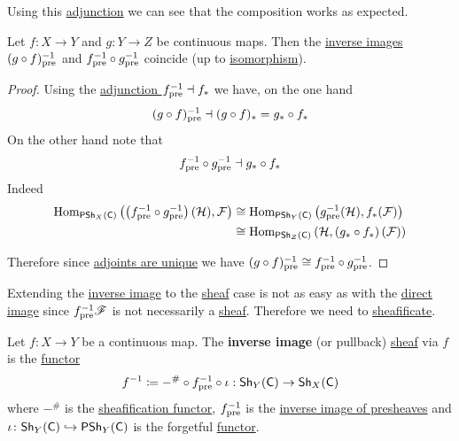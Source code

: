 \documentclass[../../main]{subfiles}
\begin{document}
Using this \hyperref[def:adjoint-functors]{adjunction} we can see that the composition works as expected.
\begin{lemma}\label{lemma:composition-inverse-image-presheaf}
  Let \(f\colon X \to Y\) and \(g\colon Y \to Z\) be continuous maps.
  Then the \hyperref[def:inverse-image-presheaf]{inverse images} \((g \circ f)_{\operatorname*{pre}}^{-1}\) and \(f_{\operatorname*{pre}}^{-1} \circ g_{\operatorname*{pre}}^{-1}\) coincide (up to \hyperref[def:categorical-isomorphism]{isomorphism}).
\end{lemma}
\begin{proof}
  Using the \hyperref[thm:direct-inverse-image-adjunction-presheaf]{adjunction \(f_{\operatorname*{pre}}^{-1} \dashv f_{\ast}\)} we have, on the one hand
  \begin{equation*}
    (g \circ f)_{\operatorname*{pre}}^{-1} \dashv (g \circ f)_{\ast} = g_{\ast} \circ f_{\ast}
  \end{equation*}
  On the other hand note that
  \begin{equation*}
    f_{\operatorname*{pre}}^{-1} \circ g_{\operatorname*{pre}}^{-1} \dashv g_{\ast} \circ f_{\ast}
  \end{equation*}
  Indeed
  \begin{align*}
    \operatorname{Hom}_{\mathsf{PSh}_{X}(\mathsf{C})} \left( \left( f_{\operatorname*{pre}}^{-1} \circ g_{\operatorname*{pre}}^{-1} \right) (\mathcal{H}), \mathcal{F} \right) &\cong \operatorname{Hom}_{\mathsf{PSh}_{Y}(\mathsf{C})} \left( g_{\operatorname*{pre}}^{-1}(\mathcal{H}), f_{\ast}(\mathcal{F}) \right) \\
                                                                                                   &\cong \operatorname{Hom}_{\mathsf{PSh}_{Z}(\mathsf{C})} \left( \mathcal{H}, \left( g_{\ast} \circ f_{\ast} \right)(\mathcal{F}) \right)
  \end{align*}

  Therefore since \hyperref[prop:uniqueness-adjoints]{adjoints are unique} we have \((g \circ f)_{\operatorname*{pre}}^{-1} \cong f_{\operatorname*{pre}}^{-1} \circ g_{\operatorname*{pre}}^{-1}\).
\end{proof}

Extending the \hyperref[def:inverse-image-presheaf]{inverse image} to the \hyperref[def:sheaf]{sheaf} case is not as easy as with the \hyperref[def:direct-image-sheaf]{direct image} since \(f_{\operatorname{pre}}^{-1}\mathscr{F}\) is not necessarily a \hyperref[def:sheaf]{sheaf}.
Therefore we need to \hyperref[def:sheafification]{sheafificate}.
\begin{definition}\label{def:inverse-image-sheaf}
  Let \(f\colon X \to Y\) be a continuous map.
  The \textbf{inverse image} (or pullback) \hyperref[def:sheaf]{sheaf} via \(f\) is the \hyperref[def:functor]{functor}
  \begin{equation*}
    f^{-1} \coloneq -^{\#} \circ f_{\operatorname*{pre}}^{-1} \circ \iota: \mathsf{Sh}_{Y}(\mathsf{C}) \to \mathsf{Sh}_{X}(\mathsf{C})
  \end{equation*}
  where \(-^{\#}\) is the \hyperref[def:sheafification]{sheafification functor}, \(f_{\operatorname*{pre}}^{-1}\) is the \hyperref[def:inverse-image-presheaf]{inverse image of presheaves} and \(\iota\colon \mathsf{Sh}_{Y}(\mathsf{C}) \hookrightarrow \mathsf{PSh}_{Y}(\mathsf{C})\) is the forgetful \hyperref[def:functor]{functor}.
\end{definition}
\end{document}
